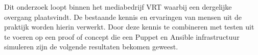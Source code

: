 Dit onderzoek loopt binnen het mediabedrijf VRT waarbij een dergelijke overgang plaatsvindt. De bestaande kennis en ervaringen van mensen uit de praktijk worden hierin verwerkt. Door deze kennis te combineren met testen uit te voeren op een proof of concept die een Puppet en Ansible infrastructuur simuleren zijn de volgende resultaten bekomen geweest.



